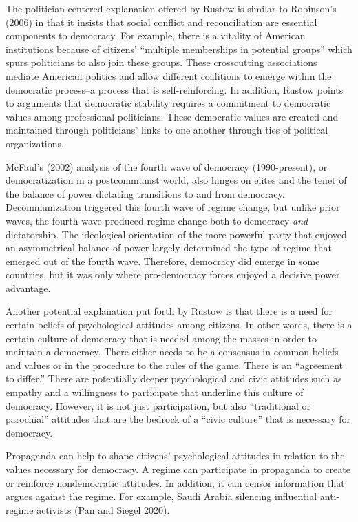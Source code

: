 \documentclass[12pt,]{article}
\begin{document}
The politician-centered explanation offered by Rustow is similar to
Robinson's (2006) in that it insists that social conflict and
reconciliation are essential components to democracy. For example, there
is a vitality of American institutions because of citizens' ``multiple
memberships in potential groups'' which spurs politicians to also join
these groups. These crosscutting associations mediate American politics
and allow different coalitions to emerge within the democratic
process--a process that is self-reinforcing. In addition, Rustow points
to arguments that democratic stability requires a commitment to
democratic values among professional politicians. These democratic
values are created and maintained through politicians' links to one
another through ties of political organizations.

McFaul's (2002) analysis of the fourth wave of democracy (1990-present),
or democratization in a postcommunist world, also hinges on elites and
the tenet of the balance of power dictating transitions to and from
democracy. Decommunization triggered this fourth wave of regime change,
but unlike prior waves, the fourth wave produced regime change both to
democracy \emph{and} dictatorship. The ideological orientation of the
more powerful party that enjoyed an asymmetrical balance of power
largely determined the type of regime that emerged out of the fourth
wave. Therefore, democracy did emerge in some countries, but it was only
where pro-democracy forces enjoyed a decisive power advantage.

Another potential explanation put forth by Rustow is that there is a
need for certain beliefs of psychological attitudes among citizens. In
other words, there is a certain culture of democracy that is needed
among the masses in order to maintain a democracy. There either needs to
be a consensus in common beliefs and values or in the procedure to the
rules of the game. There is an ``agreement to differ.'' There are
potentially deeper psychological and civic attitudes such as empathy and
a willingness to participate that underline this culture of democracy.
However, it is not just participation, but also ``traditional or
parochial'' attitudes that are the bedrock of a ``civic culture'' that
is necessary for democracy.

Propaganda can help to shape citizens' psychological attitudes in
relation to the values necessary for democracy. A regime can participate
in propaganda to create or reinforce nondemocratic attitudes. In
addition, it can censor information that argues against the regime. For
example, Saudi Arabia silencing influential anti-regime activists (Pan
and Siegel 2020).
\end{document}
